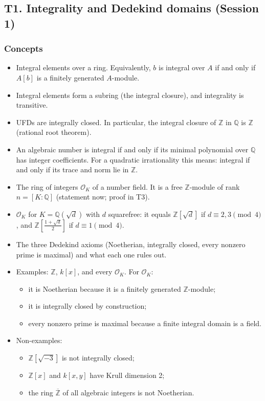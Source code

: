 \documentclass[11pt]{article}
\newcommand{\Z}{\mathbb{Z}}
\newcommand{\Q}{\mathbb{Q}}
\newcommand{\OK}{\mathcal{O}_K}
\begin{document}
\subsection{T1. Integrality and Dedekind domains (Session 1)}

\subsubsection*{Concepts}
\begin{itemize}
  \item Integral elements over a ring. Equivalently, $b$ is integral over $A$ if and only if $A[b]$ is a finitely generated $A$-module.
  \item Integral elements form a subring (the integral closure), and integrality is transitive.
  \item UFDs are integrally closed. In particular, the integral closure of $\Z$ in $\Q$ is $\Z$ (rational root theorem).
  \item An algebraic number is integral if and only if its minimal polynomial over $\Q$ has integer coefficients. For a quadratic irrationality this means: integral if and only if its trace and norm lie in $\Z$.
  \item The ring of integers $\OK$ of a number field. It is a free $\Z$-module of rank $n=[K:\Q]$ (statement now; proof in T3).
  \item $\OK$ for $K=\Q(\sqrt d)$ with $d$ squarefree: it equals $\Z[\sqrt d]$ if $d\equiv 2,3\pmod 4$, and $\Z\!\left[\tfrac{1+\sqrt d}{2}\right]$ if $d\equiv 1\pmod 4$.
  \item The three Dedekind axioms (Noetherian, integrally closed, every nonzero prime is maximal) and what each one rules out.
  \item Examples: $\Z$, $k[x]$, and every $\OK$. For $\OK$:
  \begin{itemize}
    \item it is Noetherian because it is a finitely generated $\Z$-module;
    \item it is integrally closed by construction;
    \item every nonzero prime is maximal because a finite integral domain is a field.
  \end{itemize}
  \item Non-examples:
  \begin{itemize}
    \item $\Z[\sqrt{-3}]$ is not integrally closed;
    \item $\Z[x]$ and $k[x,y]$ have Krull dimension 2;
    \item the ring $\overline{\Z}$ of all algebraic integers is not Noetherian.
  \end{itemize}
\end{itemize}
\end{document}
